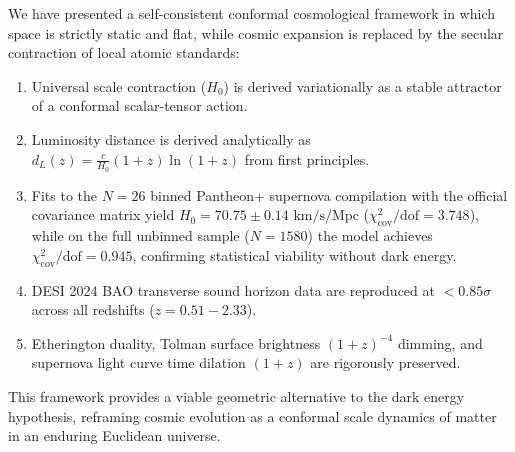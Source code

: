 \documentclass[11pt,a4paper]{article}
\begin{document}
We have presented a self-consistent conformal cosmological framework in which space is strictly static and flat, while cosmic expansion is replaced by the secular contraction of local atomic standards:
\begin{enumerate}
    \item Universal scale contraction ($H_0$) is derived variationally as a stable attractor of a conformal scalar-tensor action.
    \item Luminosity distance is derived analytically as $d_L(z) = \frac{c}{H_0} (1+z) \ln(1+z)$ from first principles.
    \item Fits to the $N=26$ binned Pantheon+ supernova compilation with the official covariance matrix yield $H_0 = 70.75 \pm 0.14\text{ km/s/Mpc}$ ($\chi^2_{\mathrm{cov}}/\text{dof} = 3.748$), while on the full unbinned sample ($N=1580$) the model achieves $\chi^2_{\mathrm{cov}}/\text{dof} = 0.945$, confirming statistical viability without dark energy.
    \item DESI 2024 BAO transverse sound horizon data are reproduced at $< 0.85\sigma$ across all redshifts ($z = 0.51 - 2.33$).
    \item Etherington duality, Tolman surface brightness $(1+z)^{-4}$ dimming, and supernova light curve time dilation $(1+z)$ are rigorously preserved.
\end{enumerate}

This framework provides a viable geometric alternative to the dark energy hypothesis, reframing cosmic evolution as a conformal scale dynamics of matter in an enduring Euclidean universe.
\end{document}
